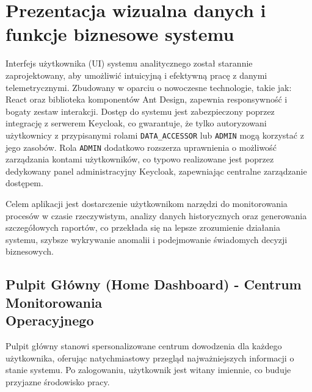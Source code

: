 \section{Prezentacja wizualna danych i funkcje biznesowe systemu}
\label{chap:prezentacja_wizualna}

Interfejs użytkownika (UI) systemu analitycznego został starannie zaprojektowany, aby umożliwić intuicyjną i efektywną pracę z danymi telemetrycznymi. Zbudowany w oparciu o nowoczesne technologie, takie jak: React oraz biblioteka komponentów Ant Design, zapewnia responsywność i bogaty zestaw interakcji. Dostęp do systemu jest zabezpieczony poprzez integrację z serwerem Keycloak, co gwarantuje, że tylko autoryzowani użytkownicy z przypisanymi rolami \texttt{DATA\_ACCESSOR} lub \texttt{ADMIN} mogą korzystać z jego zasobów. Rola \texttt{ADMIN} dodatkowo rozszerza uprawnienia o możliwość zarządzania kontami użytkowników, co typowo realizowane jest poprzez dedykowany panel administracyjny Keycloak, zapewniając centralne zarządzanie dostępem.

Celem aplikacji jest dostarczenie użytkownikom narzędzi do monitorowania procesów w czasie rzeczywistym, analizy danych historycznych oraz generowania szczegółowych raportów, co przekłada się na lepsze zrozumienie działania systemu, szybsze wykrywanie anomalii i podejmowanie świadomych decyzji biznesowych.

\subsection{Pulpit Główny (Home Dashboard) - Centrum Monitorowania \\ Operacyjnego}

Pulpit główny stanowi spersonalizowane centrum dowodzenia dla każdego użytkownika, oferując natychmiastowy przegląd najważniejszych informacji o stanie systemu. Po zalogowaniu, użytkownik jest witany imiennie, co buduje przyjazne środowisko pracy.


